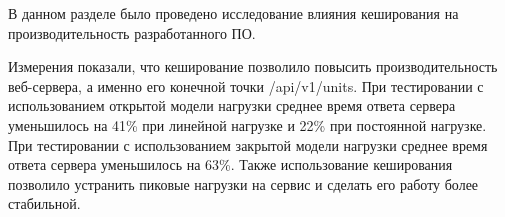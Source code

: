 

В данном разделе было проведено исследование влияния кеширования на производительность разработанного ПО.

Измерения показали, что кеширование позволило повысить производительность веб-сервера, а именно его конечной точки /api/v1/units. При тестировании с использованием открытой модели нагрузки среднее время ответа сервера уменьшилось на 41\% при линейной нагрузке и 22\% при постоянной нагрузке. При тестировании с использованием закрытой модели нагрузки среднее время ответа сервера уменьшилось на 63\%. Также использование кеширования позволило устранить пиковые нагрузки на сервис и сделать его работу более стабильной.



\pagebreak